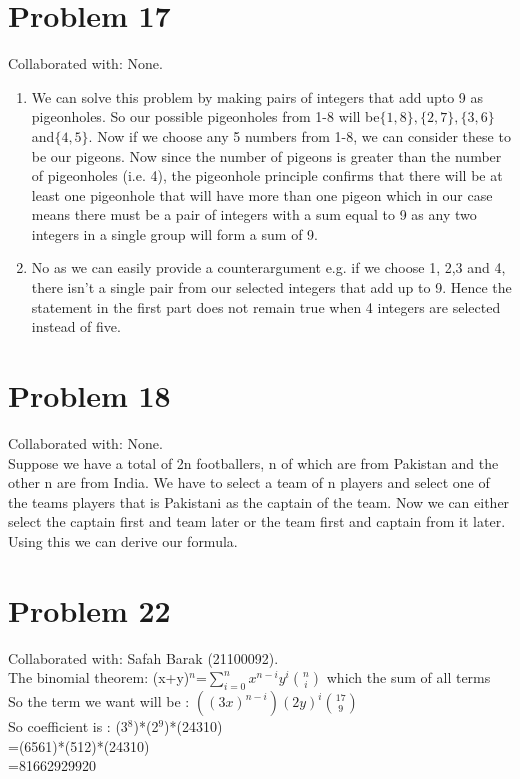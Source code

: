 \documentclass{article}
\begin{document}
\section{Problem 17}
Collaborated with: None.\\
\begin{enumerate}
\item %
We can solve this problem by making pairs of integers that add upto 9 as pigeonholes. So our possible pigeonholes from 1-8 will be$\{1,8\},\{2,7\},\{3,6\}$ and$\{4,5\}$. Now if we choose any 5 numbers from 1-8, we can consider these to be our pigeons. Now since the number of pigeons is greater than the number of pigeonholes (i.e. 4), the pigeonhole principle confirms that there will be at least one pigeonhole that will have more than one pigeon which in our case means there must be a pair of integers with a sum equal to 9 as any two integers in a single group will form a sum of 9. 
\item %
No as we can easily provide a counterargument e.g. if we choose 1, 2,3 and 4, there isn't a single pair from our selected integers that add up to 9. Hence the statement in the first part does not remain true when 4 integers are selected instead of five.
\end{enumerate}

\section{Problem 18}
Collaborated with: None.\\
Suppose we have a total of 2n footballers, n of which are from Pakistan and the other n are from India. We have to select a team of n players and select one of the teams players that is Pakistani as the captain of the team. Now we can either select the captain first and team later or the team first and captain from it later. Using this we can derive our formula.


\section{Problem 22}
Collaborated with: Safah Barak (21100092).\\
The binomial theorem: (x+y)$^{n}$=$\sum_{i=0}^{n} x^{n-i} y^{i} {n\choose i}$ which the sum of all terms \\
So the term we want will be : $((3x)^{n-i}) (2y)^{i} {17\choose 9}$\\
So coefficient is : (3$^{8} $)*(2$^9$)*(24310)\\
=(6561)*(512)*(24310)\\
=81662929920\\
\end{document}
